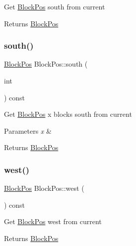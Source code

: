 Get \mbox{\hyperlink{struct_block_pos}{Block\+Pos}} south from current \begin{DoxyReturn}{Returns}
\mbox{\hyperlink{struct_block_pos}{Block\+Pos}} 
\end{DoxyReturn}
\mbox{\label{struct_block_pos_a71d93e0bc00d67547d8df6177cc43556}} 
\subsubsection{\texorpdfstring{south()}{south()}\hspace{0.1cm}{\footnotesize\ttfamily [2/2]}}
{\footnotesize\ttfamily \mbox{\hyperlink{struct_block_pos}{Block\+Pos}} Block\+Pos\+::south (\begin{DoxyParamCaption}\item[{int}]{ }\end{DoxyParamCaption}) const}

Get \mbox{\hyperlink{struct_block_pos}{Block\+Pos}} x blocks south from current 
\begin{DoxyParams}{Parameters}
{\em x} & \\
\hline
\end{DoxyParams}
\begin{DoxyReturn}{Returns}
\mbox{\hyperlink{struct_block_pos}{Block\+Pos}} 
\end{DoxyReturn}
\mbox{\label{struct_block_pos_a315e5d7785e8f8925030bdcd5fe4a3d5}} 
\subsubsection{\texorpdfstring{west()}{west()}\hspace{0.1cm}{\footnotesize\ttfamily [1/2]}}
{\footnotesize\ttfamily \mbox{\hyperlink{struct_block_pos}{Block\+Pos}} Block\+Pos\+::west (\begin{DoxyParamCaption}{ }\end{DoxyParamCaption}) const}

Get \mbox{\hyperlink{struct_block_pos}{Block\+Pos}} west from current \begin{DoxyReturn}{Returns}
\mbox{\hyperlink{struct_block_pos}{Block\+Pos}} 
\end{DoxyReturn}
\mbox{\label{struct_block_pos_aec17e41f3241596d751360d2b0ced8d1}} 
